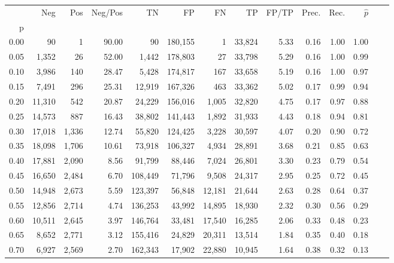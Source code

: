 \begin{tabular}{rrrrrrrrrrrrrr}
\toprule
{} &     Neg &    Pos & Neg/Pos &       TN &       FP &      FN &      TP & FP/TP & Prec. &  Rec. & $\hat{p}$ \\
p    &         &        &         &          &          &         &         &       &       &       &           \\
\midrule
0.00 &      90 &      1 &   90.00 &       90 &  180,155 &       1 &  33,824 &  5.33 &  0.16 &  1.00 &      1.00 \\
0.05 &   1,352 &     26 &   52.00 &    1,442 &  178,803 &      27 &  33,798 &  5.29 &  0.16 &  1.00 &      0.99 \\
0.10 &   3,986 &    140 &   28.47 &    5,428 &  174,817 &     167 &  33,658 &  5.19 &  0.16 &  1.00 &      0.97 \\
0.15 &   7,491 &    296 &   25.31 &   12,919 &  167,326 &     463 &  33,362 &  5.02 &  0.17 &  0.99 &      0.94 \\
0.20 &  11,310 &    542 &   20.87 &   24,229 &  156,016 &   1,005 &  32,820 &  4.75 &  0.17 &  0.97 &      0.88 \\
0.25 &  14,573 &    887 &   16.43 &   38,802 &  141,443 &   1,892 &  31,933 &  4.43 &  0.18 &  0.94 &      0.81 \\
0.30 &  17,018 &  1,336 &   12.74 &   55,820 &  124,425 &   3,228 &  30,597 &  4.07 &  0.20 &  0.90 &      0.72 \\
0.35 &  18,098 &  1,706 &   10.61 &   73,918 &  106,327 &   4,934 &  28,891 &  3.68 &  0.21 &  0.85 &      0.63 \\
0.40 &  17,881 &  2,090 &    8.56 &   91,799 &   88,446 &   7,024 &  26,801 &  3.30 &  0.23 &  0.79 &      0.54 \\
0.45 &  16,650 &  2,484 &    6.70 &  108,449 &   71,796 &   9,508 &  24,317 &  2.95 &  0.25 &  0.72 &      0.45 \\
0.50 &  14,948 &  2,673 &    5.59 &  123,397 &   56,848 &  12,181 &  21,644 &  2.63 &  0.28 &  0.64 &      0.37 \\
0.55 &  12,856 &  2,714 &    4.74 &  136,253 &   43,992 &  14,895 &  18,930 &  2.32 &  0.30 &  0.56 &      0.29 \\
0.60 &  10,511 &  2,645 &    3.97 &  146,764 &   33,481 &  17,540 &  16,285 &  2.06 &  0.33 &  0.48 &      0.23 \\
0.65 &   8,652 &  2,771 &    3.12 &  155,416 &   24,829 &  20,311 &  13,514 &  1.84 &  0.35 &  0.40 &      0.18 \\
0.70 &   6,927 &  2,569 &    2.70 &  162,343 &   17,902 &  22,880 &  10,945 &  1.64 &  0.38 &  0.32 &      0.13 \\

\end{tabular}

